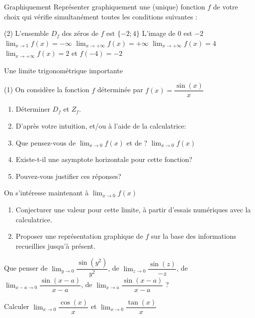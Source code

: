 \documentclass[a4paper,12pt]{article}
\begin{document}
\begin{activite}[label=acti:constrgraph]
Graphiquement
\tcblower
Représenter graphiquement une (unique) fonction $f$ de votre choix qui vérifie simultanément toutes les conditions suivantes :

\begin{tasks}(2)
\task L'ensemble $D_f$ des zéros de $f$ est $\{-2;4\}$
\task L'image de $0$ est $-2$
\task $\displaystyle\lim_{x \to 1} f(x) = -\infty$
\task $\displaystyle\lim_{x \to +\infty} f(x) = +\infty$
\task $\displaystyle\lim_{x \to +\infty} f(x) = 4$
\task $\displaystyle\lim_{x \to +\infty} f(x) = 2$ et $f(-4) = -2$
\end{tasks}
\end{activite}

\begin{activite}{Une limite trigonométrique importante}
\tcblower
\begin{tasks}(1)
\task On considère la fonction $f$ déterminée par $f(x) = \dfrac{\sin(x)}{x}$
\begin{enumerate}
\item Déterminer $D_f$ et $Z_f$.
\item D'après votre intuition, et/ou à l'aide de la calculatrice:
\item Que pensez-vous de $\displaystyle\lim_{x \to 0} f(x)$ et de ? $\displaystyle\lim_{x \to 0} f(x)$
\item Existe-t-il une asymptote horizontale pour cette fonction?
\item Pouvez-vous justifier ces réponses?
\end{enumerate}

\task On s'intéresse maintenant à $\displaystyle\lim_{x \to 0} f(x)$
\begin{enumerate}
\item Conjecturer une valeur pour cette limite, à partir d'essais numériques avec la calculatrice.
\item Proposer une représentation graphique de $f$ sur la base des informations recueillies jusqu'à présent.
\end{enumerate}

\task Que penser de $\displaystyle\lim_{y \to 0} \dfrac{\sin(y^2)}{y^2}$, de $\displaystyle\lim_{z \to 0} \dfrac{\sin(z)}{-z}$, de $\displaystyle\lim_{x-a \to 0} \dfrac{\sin(x-a)}{x-a}$, de $\displaystyle\lim_{x \to a} \dfrac{\sin(x-a)}{x-a}$ ?

\task Calculer $\displaystyle\lim_{x \to 0} \dfrac{\cos(x)}{x}$ et $\displaystyle\lim_{x \to 0} \dfrac{\tan(x)}{x}$
\end{tasks}
\end{activite}
\end{document}
